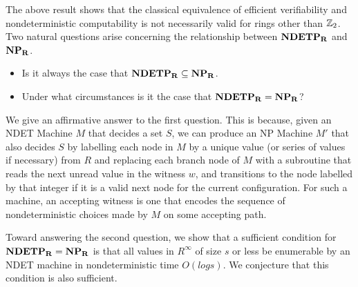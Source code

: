 The above result shows that the classical equivalence of efficient
verifiability and nondeterministic computability is not necessarily
valid for rings other than $\mathbb{Z}_2$.  Two natural questions
arise concerning the relationship between $\mathbf{NDETP_R}$ and $\mathbf{NP_R}$.  

\begin{itemize}
\item Is it always the case that $\mathbf{NDETP_R} \subseteq \mathbf{NP_R}$.
\item Under what circumstances is it the case that $\mathbf{NDETP_R} = \mathbf{NP_R}$?
\end{itemize}

We give an affirmative answer to the first question.  This is
because, given an NDET Machine $M$ that decides a set $S$, we can
produce an NP Machine $M'$ that also decides $S$ by labelling each
node in $M$ by a unique value (or series of values if necessary)
from $R$ and replacing each branch node of $M$ with a subroutine
that reads the next unread value in the witness $w$, and transitions
to the node labelled by that integer if it is a valid next node for
the current configuration. For such a machine, an accepting witness
is one that encodes the sequence of nondeterministic choices made by
$M$ on some accepting path.




Toward answering the second question, we show that a sufficient
condition for $\mathbf{NDETP_R} = \mathbf{NP_R}$ is that all values in $R^\infty$ of
size $s$ or less be enumerable by an NDET machine in
nondeterministic time $O(log s)$.  We conjecture that this condition
is also sufficient.  

